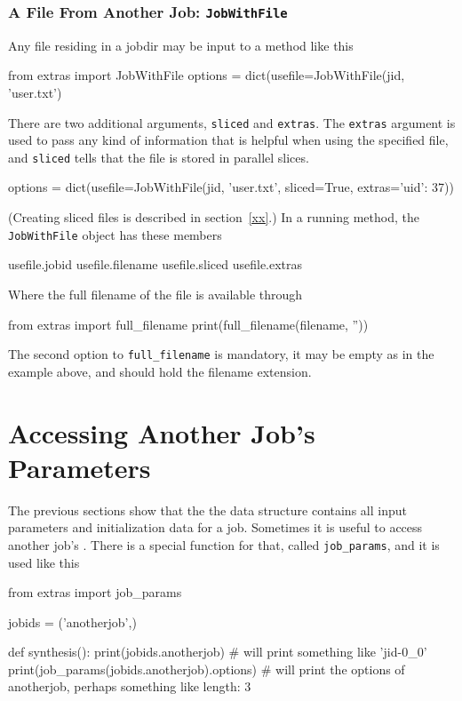 \subsubsection*{A File From Another Job:  \texttt{JobWithFile}}
Any file residing in a jobdir may be input to a method like this
\begin{python}
from extras import JobWithFile
options = dict(usefile=JobWithFile(jid, 'user.txt')
\end{python}
There are two additional arguments, \texttt{sliced} and
\texttt{extras}.  The \texttt{extras} argument is used to pass any
kind of information that is helpful when using the specified file, and
\texttt{sliced} tells that the file is stored in parallel slices.
\begin{python}
options = dict(usefile=JobWithFile(jid, 'user.txt', sliced=True, extras={'uid': 37}))
\end{python}
(Creating sliced files is described in section~\ref{xx}.)  In a
running method, the \texttt{JobWithFile} object has these members
\begin{python}
usefile.jobid
usefile.filename
usefile.sliced
usefile.extras
\end{python}
Where the full filename of the file is available through
\begin{python}
from extras import full_filename
print(full_filename(filename, ''))
\end{python}
The second option to \texttt{full\_filename} is mandatory, it may be
empty as in the example above, and should hold the filename extension.



\section{Accessing Another Job's Parameters}

The previous sections show that the the \params data structure
contains all input parameters and initialization data for a job.
Sometimes it is useful to access another job's \params.  There is a
special function for that, called \texttt{job\_params}, and it is used
like this
\begin{python}
from extras import job_params

jobids = ('anotherjob',)

def synthesis():
    print(jobids.anotherjob)
    # will print something like 'jid-0_0'
    print(job_params(jobids.anotherjob).options)
    # will print the options of anotherjob, perhaps something like {length: 3}
\end{python}


